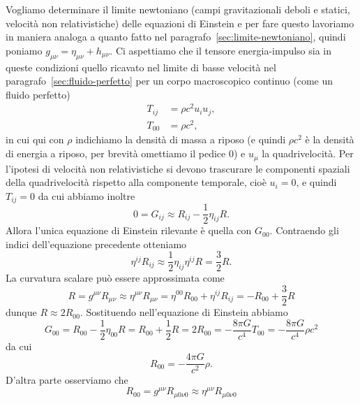 Vogliamo determinare il limite newtoniano (campi gravitazionali deboli e
statici, velocità non relativistiche) delle equazioni di Einstein e per fare
questo lavoriamo in maniera analoga a quanto fatto nel
paragrafo~\ref{sec:limite-newtoniano}, quindi poniamo
$g_{\mu\nu} = \eta_{\mu\nu} + h_{\mu\nu}$.  Ci aspettiamo che il tensore
energia-impulso sia in queste condizioni quello ricavato nel limite di basse
velocità nel paragrafo~\ref{sec:fluido-perfetto} per un corpo macroscopico
continuo (come un fluido perfetto)
\begin{subequations}
  \begin{align}
    T_{ij} &= \rho c^{2} u_{i} u_{j}, \\
    T_{00} &= \rho c^{2},
  \end{align}
\end{subequations}
in cui qui con $\rho$ indichiamo la densità di massa a riposo (e quindi
$\rho c^{2}$ è la densità di energia a riposo, per brevità omettiamo il pedice
$0$) e $u_{\mu}$ la quadrivelocità.  Per l'ipotesi di velocità non
relativistiche si devono trascurare le componenti spaziali della quadrivelocità
rispetto alla componente temporale, cioè $u_{i} = 0$, e quindi $T_{ij} = 0$ da
cui abbiamo inoltre
\begin{equation}
  0 = G_{ij} \approx R_{ij} - \frac{1}{2}\eta_{ij}R.
\end{equation}
Allora l'unica equazione di Einstein rilevante è quella con $G_{00}$.
Contraendo gli indici dell'equazione precedente otteniamo
\begin{equation}
  \eta^{ij}R_{ij} \approx \frac{1}{2} \eta_{ij}\eta^{ij} R = \frac{3}{2} R.
\end{equation}
La curvatura scalare può essere approssimata come
\begin{equation}
  R = g^{\mu\nu}R_{\mu\nu} \approx \eta^{\mu\nu} R_{\mu\nu} = \eta^{00}R_{00} +
  \eta^{ij}R_{ij} = -R_{00} + \frac{3}{2} R
\end{equation}
dunque $R \approx 2 R_{00}$.  Sostituendo nell'equazione di Einstein abbiamo
\begin{equation}
  G_{00} = R_{00} - \frac{1}{2} \eta_{00}R = R_{00} + \frac{1}{2} R = 2 R_{00} =
  -\frac{8\pi G}{c^{4}} T_{00} = -\frac{8\pi G}{c^{4}} \rho c^{2}
\end{equation}
da cui
\begin{equation}
  R_{00} = -\frac{4\pi G}{c^{2}} \rho.
\end{equation}
D'altra parte osserviamo che
\begin{equation}
  R_{00} = g^{\mu\nu}R_{\mu 0\nu 0} \approx \eta^{\mu\nu}R_{\mu 0\nu 0}
\end{equation}
